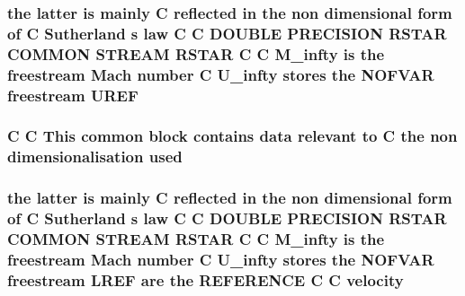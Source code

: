 \hypertarget{home_2abonfi_2_c_f_d__codes_2_eul_f_s_83_84_2include_2stream_8com_ab0954e3210109eba37b309fef6a66996}{
\subsubsection[{U\-R\-E\-F}]{\setlength{\rightskip}{0pt plus 5cm}the latter is mainly C reflected in the non dimensional form of C Sutherland s law C C D\-O\-U\-B\-L\-E P\-R\-E\-C\-I\-S\-I\-O\-N R\-S\-T\-A\-R C\-O\-M\-M\-O\-N S\-T\-R\-E\-A\-M R\-S\-T\-A\-R C C {\bf M\-\_\-infty} is the freestream Mach number C {\bf U\-\_\-infty} stores the N\-O\-F\-V\-A\-R freestream U\-R\-E\-F}}\label{home_2abonfi_2_c_f_d__codes_2_eul_f_s_83_84_2include_2stream_8com_ab0954e3210109eba37b309fef6a66996}
\hypertarget{home_2abonfi_2_c_f_d__codes_2_eul_f_s_83_84_2include_2stream_8com_a3291a21585d0aec360cd82d75bf51496}{
\subsubsection[{used}]{\setlength{\rightskip}{0pt plus 5cm}C C This common block contains data relevant to C the non {\bf dimensionalisation} used}}\label{home_2abonfi_2_c_f_d__codes_2_eul_f_s_83_84_2include_2stream_8com_a3291a21585d0aec360cd82d75bf51496}
\hypertarget{home_2abonfi_2_c_f_d__codes_2_eul_f_s_83_84_2include_2stream_8com_a4acbada976d4b32776408b1d1e55321a}{
\subsubsection[{velocity}]{\setlength{\rightskip}{0pt plus 5cm}the latter is mainly C reflected in the non dimensional form of C Sutherland s law C C D\-O\-U\-B\-L\-E P\-R\-E\-C\-I\-S\-I\-O\-N R\-S\-T\-A\-R C\-O\-M\-M\-O\-N S\-T\-R\-E\-A\-M R\-S\-T\-A\-R C C {\bf M\-\_\-infty} is the freestream Mach number C {\bf U\-\_\-infty} stores the N\-O\-F\-V\-A\-R freestream {\bf L\-R\-E\-F} {\bf are} the R\-E\-F\-E\-R\-E\-N\-C\-E C C velocity}}\label{home_2abonfi_2_c_f_d__codes_2_eul_f_s_83_84_2include_2stream_8com_a4acbada976d4b32776408b1d1e55321a}

